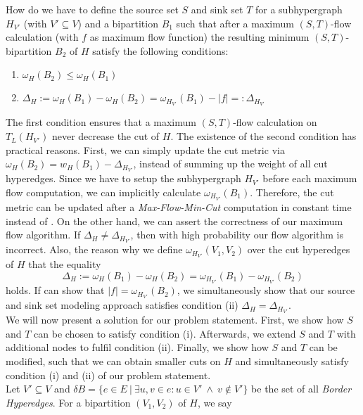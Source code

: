 \begin{problem}
\label{prob:ST}
How do we have to define the source set $S$ and sink set $T$ for a subhypergraph $H_{V'}$ 
(with $V' \subseteq V$) and a bipartition $B_1$ such that 
after a maximum $(S,T)$-flow calculation (with $f$ as maximum flow function)
the resulting minimum $(S,T)$-bipartition $B_2$ of $H$ satisfy the following conditions:
\begin{enumerate}
\item $\omega_H(B_2) \le \omega_H(B_1)$
\item $\Delta_{H} := \omega_H(B_1) - \omega_H(B_2) = \omega_{H_{V'}}(B_1) - |f| =: \Delta_{H_{V'}}$
\end{enumerate}
\end{problem}

The first condition ensures that a maximum $(S,T)$-flow calculation on $T_L(H_{V'})$ never 
decrease the cut of $H$. The existence of the second condition has practical reasons. First, we
can simply update the cut metric via $\omega_H(B_2) = w_H(B_1) - \Delta_{H_{V'}}$,
instead of summing up the weight of all cut hyperedges. Since we have to setup the subhypergraph
$H_{V'}$ before each maximum flow computation, we can implicitly calculate $\omega_{H_{V'}}(B_1)$.
Therefore, the cut metric can be updated after a \emph{Max-Flow-Min-Cut} computation
in constant time instead of . On the other hand, we can assert the correctness of
our maximum flow algorithm. If $\Delta_H \neq \Delta_{H_{V'}}$, then with high probability our
flow algorithm is incorrect. Also, the reason why we define $\omega_{H_{V'}}(V_1,V_2)$ over
the cut hyperedges of $H$ that the equality
\[\Delta_{H} := \omega_H(B_1) - \omega_H(B_2) = \omega_{H_{V'}}(B_1) - \omega_{H_{V'}}(B_2)\]
holds. If can show that $|f| = \omega_{H_{V'}}(B_2)$, we simultaneously show
that our source and sink set modeling approach satisfies condition (ii) 
$\Delta_H = \Delta_{H_{V'}}$.\\
We will now present a solution for our problem statement. First, we show how $S$ and $T$
can be chosen to satisfy condition (i). Afterwards, we extend $S$ and $T$ with additional
nodes to fulfil condition (ii). Finally, we show how $S$ and $T$ can be modified, such that
we can obtain smaller cuts on $H$ and simultaneously satisfy condition (i) and (ii) of our problem
statement. \\
Let $V' \subseteq V$ and $\delta B = \{ e \in E\ |\ \exists u,v \in e: u \in V'\ \land\ v \notin V' \}$
be the set of all \emph{Border Hyperedges}. For a bipartition $(V_1,V_2)$ of $H$, we say
